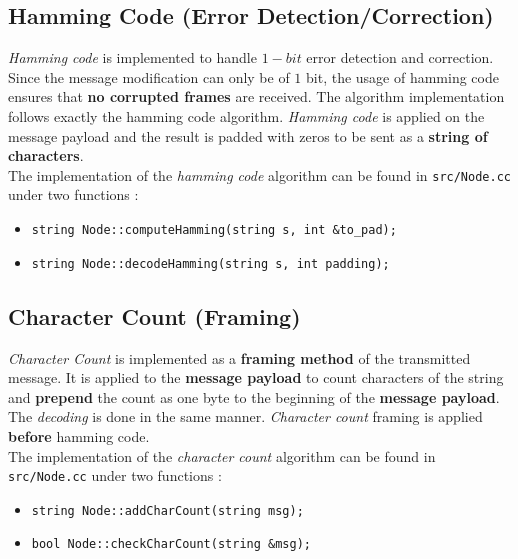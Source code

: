 \subsection{Hamming Code (Error Detection/Correction)}
\emph{Hamming code} is implemented to handle $1-bit$ error detection and correction. Since the message modification can only be of $1$ bit, the usage of hamming code ensures that \textbf{no corrupted frames} are received. The algorithm implementation follows exactly the hamming code algorithm. \emph{Hamming code} is applied on the message payload and the result is padded with zeros to be sent as a \textbf{string of characters}. \\

The implementation of the \emph{hamming code} algorithm can be found in \texttt{src/Node.cc} under two functions :
\begin{itemize}
    \item \texttt{string Node::computeHamming(string s, int \&to\_pad);}
    \item \texttt{string Node::decodeHamming(string s, int padding);}
\end{itemize}

\subsection{Character Count (Framing)}
\emph{Character Count} is implemented as a \textbf{framing method} of the transmitted message. It is applied to the \textbf{message payload} to count characters of the string and \textbf{prepend} the count as one byte to the beginning of the \textbf{message payload}. The \emph{decoding} is done in the same manner. \emph{Character count} framing is applied \textbf{before} hamming code. \\

The implementation of the \emph{character count} algorithm can be found in \texttt{src/Node.cc} under two functions :
\begin{itemize}
    \item \texttt{string Node::addCharCount(string msg);}
    \item \texttt{bool Node::checkCharCount(string \&msg);}
\end{itemize}

